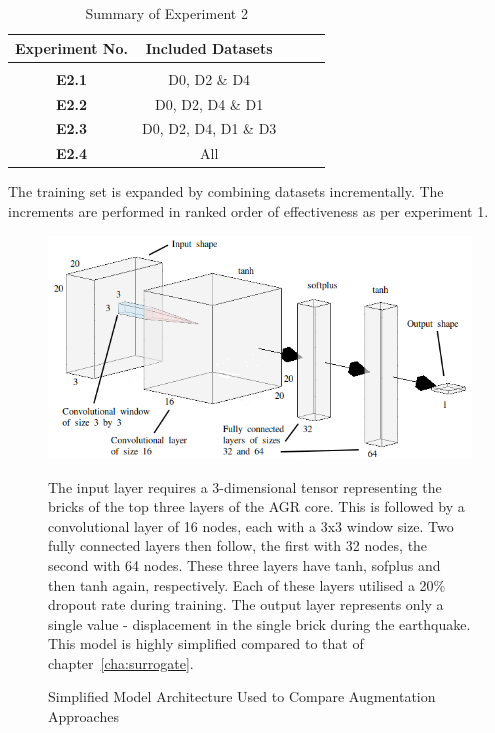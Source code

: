 \begin{table}[h!]
	 \begin{center}
		
		\begin{tabular}{c|c|c|r|c} %
			\textbf{Experiment No.} & \textbf{Included Datasets}  \\
			
			\hline
			& \\
			
			\textbf{E2.1} & D0, D2 \& D4 \\     %
			\textbf{E2.2} & D0, D2, D4  \& D1 \\  %
			\textbf{E2.3} & D0, D2, D4, D1 \& D3  \\  %
			\textbf{E2.4} & All \\
			
		\end{tabular}
		\caption{Summary of Experiment 2} {The training set is expanded by combining datasets incrementally. The increments are performed in ranked order of effectiveness as per experiment 1.}
		\label{tab:Experiment2}
		 \end{center}
\end{table}

\begin{figure}[h]
	\centering
	\includegraphics[scale=0.35]{Figures/SimpleModelImproved2.png}
	\caption{ Simplified Model Architecture Used to Compare Augmentation Approaches} {The input layer requires a 3-dimensional tensor representing the bricks of the top three layers of the AGR core. This is followed by a convolutional layer of 16 nodes, each with a 3x3 window size. Two fully connected layers then follow, the first with 32 nodes, the second with 64 nodes. These three layers have tanh, sofplus \cite{zheng2015improving} and then tanh again, respectively. Each of these layers utilised a 20\% dropout rate \cite{srivastava2014dropout} during training. The output layer represents only a single value - displacement in the single brick during the earthquake. This model is highly simplified compared to that of chapter~\ref{cha:surrogate}. }
	\label{fig:SimpleModel}
\end{figure}

